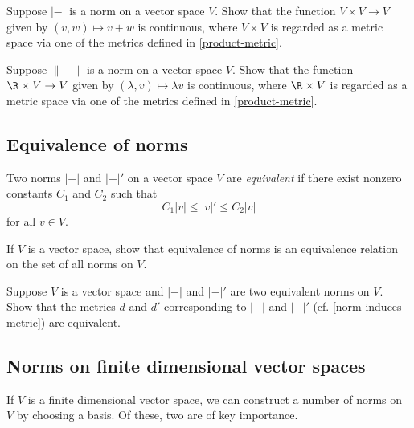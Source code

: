 \begin{exercise} \label{addition-continuous}
	Suppose $|-|$ is a norm on a vector space $V$. Show that the function $V \times V \to V$ given by $(v, w) \mapsto v+w$ is continuous, where $V \times V$ is regarded as a metric space via one of the metrics defined in \cref{product-metric}. 
\end{exercise}

\begin{exercise} \label{scalar-multiplication-continuous}
	Suppose $\|-\|$ is a norm on a vector space $V$. Show that the function $\R \times V \to V$ given by $(\lambda, v) \mapsto \lambda v$ is continuous, where $\R \times V$ is regarded as a metric space via one of the metrics defined in \cref{product-metric}. 
\end{exercise}

\subsection{Equivalence of norms}

\begin{definition} \label{norm-equivalence-definition}
	Two norms $|-|$ and $|-|'$ on a vector space $V$ are \emph{equivalent} if there exist nonzero constants $C_1$ and $C_2$ such that
	\[ C_1 |v| \leq |v|' \leq C_2 |v| \]
	for all $v \in V$. 
\end{definition}

\begin{exercise}
	If $V$ is a vector space, show that equivalence of norms is an equivalence relation on the set of all norms on $V$. 
\end{exercise}

\begin{exercise} \label{equivalent-norm-equivalent-metric}
	Suppose $V$ is a vector space and $|-|$ and $|-|'$ are two equivalent norms on $V$. Show that the metrics $d$ and $d'$ corresponding to $|-|$ and $|-|'$ (cf. \cref{norm-induces-metric}) are equivalent. 
\end{exercise}

\subsection{Norms on finite dimensional vector spaces}

If $V$ is a finite dimensional vector space, we can construct a number of norms on $V$ by choosing a basis. Of these, two are of key importance. 

